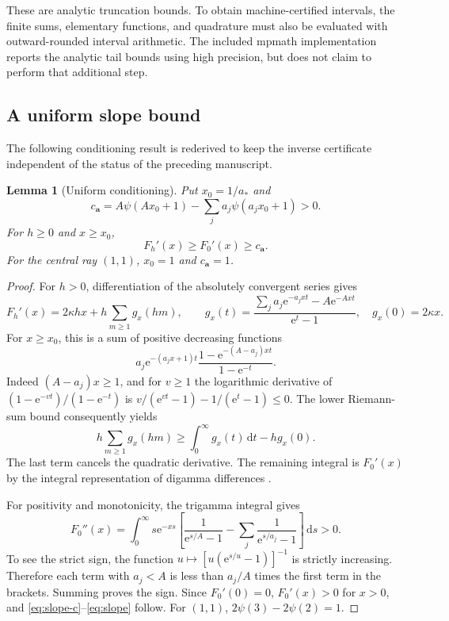 \documentclass[11pt,a4paper]{article}
\numberwithin{equation}{section}
\newtheorem{lemma}[theorem]{Lemma}
\theoremstyle{definition}\newtheorem{definition}[theorem]{Definition}
\theoremstyle{remark}\newtheorem{remark}[theorem]{Remark}
\newcommand{\e}{\mathrm e}
\newcommand{\dd}{\,\mathrm d}
\newcommand{\avec}{\boldsymbol a}
\newcommand{\astar}{a_*}
\begin{document}
These are analytic truncation bounds. To obtain machine-certified
intervals, the finite sums, elementary functions, and quadrature must also
be evaluated with outward-rounded interval arithmetic. The included
mpmath implementation reports the analytic tail bounds using high
precision, but does not claim to perform that additional step.

\subsection{A uniform slope bound}
The following conditioning result is rederived to keep the inverse
certificate independent of the status of the preceding manuscript.

\begin{lemma}[Uniform conditioning]
\label{lem:slope}
Put $x_0=1/\astar$ and
\begin{equation}
 c_{\avec}=A\psi(Ax_0+1)-\sum_j a_j\psi(a_jx_0+1)>0.
 \label{eq:slope-c}
\end{equation}
For $h\ge0$ and $x\ge x_0$,
\begin{equation}
 F_h'(x)\ge F_0'(x)\ge c_{\avec}.
 \label{eq:slope}
\end{equation}
For the central ray $(1,1)$, $x_0=1$ and $c_{\avec}=1$.
\end{lemma}
\begin{proof}
For $h>0$, differentiation of the absolutely convergent series gives
\[
 F_h'(x)=2\kappa hx+h\sum_{m\ge1}g_x(hm),\qquad
 g_x(t)=\frac{\sum_j a_j\e^{-a_jxt}-A\e^{-Axt}}{\e^t-1},
 \quad g_x(0)=2\kappa x.
\]
For $x\ge x_0$, this is a sum of positive decreasing functions
\[
 a_j\e^{-(a_jx+1)t}
 \frac{1-\e^{-(A-a_j)xt}}{1-\e^{-t}}.
\]
Indeed $(A-a_j)x\ge1$, and for $v\ge1$ the logarithmic derivative of
$(1-\e^{-vt})/(1-\e^{-t})$ is
$v/(\e^{vt}-1)-1/(\e^t-1)\le0$.
The lower Riemann-sum bound consequently yields
\[
 h\sum_{m\ge1}g_x(hm)\ge\int_0^\infty g_x(t)\dd t-hg_x(0).
\]
The last term cancels the quadratic derivative. The remaining integral
is $F_0'(x)$ by the integral representation of digamma differences
\cite{dlmf-gamma}.

For positivity and monotonicity, the trigamma integral gives
\[
 F_0''(x)=\int_0^\infty s\e^{-xs}
 \left[\frac1{\e^{s/A}-1}
              -\sum_j\frac1{\e^{s/a_j}-1}\right]\dd s>0.
\]
To see the strict sign, the function
$u\mapsto[u(\e^{s/u}-1)]^{-1}$ is strictly increasing. Therefore each
term with $a_j<A$ is less than $a_j/A$ times the first term in the
brackets. Summing proves the sign. Since $F_0'(0)=0$, $F_0'(x)>0$ for
$x>0$, and \eqref{eq:slope-c}--\eqref{eq:slope} follow.
For $(1,1)$, $2\psi(3)-2\psi(2)=1$.
\end{proof}
\end{document}
